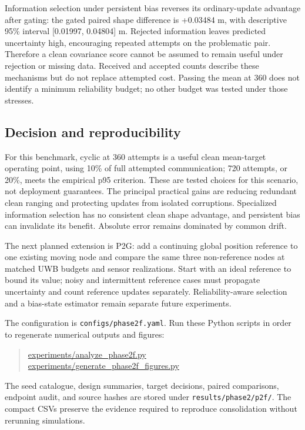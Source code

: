Information selection under persistent bias reverses its ordinary-update advantage after gating: the gated paired shape difference is +0.03484 m, with descriptive 95\% interval [0.01997, 0.04804] m. Rejected information leaves predicted uncertainty high, encouraging repeated attempts on the problematic pair. Therefore a clean covariance score cannot be assumed to remain useful under rejection or missing data. Received and accepted counts describe these mechanisms but do not replace attempted cost. Passing the mean at 360 does not identify a minimum reliability budget; no other budget was tested under those stresses.

\subsection{Decision and reproducibility}
For this benchmark, cyclic at 360 attempts is a useful clean mean-target operating point, using 10\% of full attempted communication; 720 attempts, or 20\%, meets the empirical p95 criterion. These are tested choices for this scenario, not deployment guarantees. The principal practical gains are reducing redundant clean ranging and protecting updates from isolated corruptions. Specialized information selection has no consistent clean shape advantage, and persistent bias can invalidate its benefit. Absolute error remains dominated by common drift.

The next planned extension is P2G: add a continuing global position reference to one existing moving node and compare the same three non-reference nodes at matched UWB budgets and sensor realizations. Start with an ideal reference to bound its value; noisy and intermittent reference cases must propagate uncertainty and count reference updates separately. Reliability-aware selection and a bias-state estimator remain separate future experiments.

The configuration is \texttt{configs/phase2f.yaml}. Run these Python scripts in order to regenerate numerical outputs and figures:
\begin{quote}\footnotesize
\url{experiments/analyze_phase2f.py}\\
\url{experiments/generate_phase2f_figures.py}
\end{quote}
The seed catalogue, design summaries, target decisions, paired comparisons, endpoint audit, and source hashes are stored under \texttt{results/phase2/p2f/}. The compact CSVs preserve the evidence required to reproduce consolidation without rerunning simulations.
